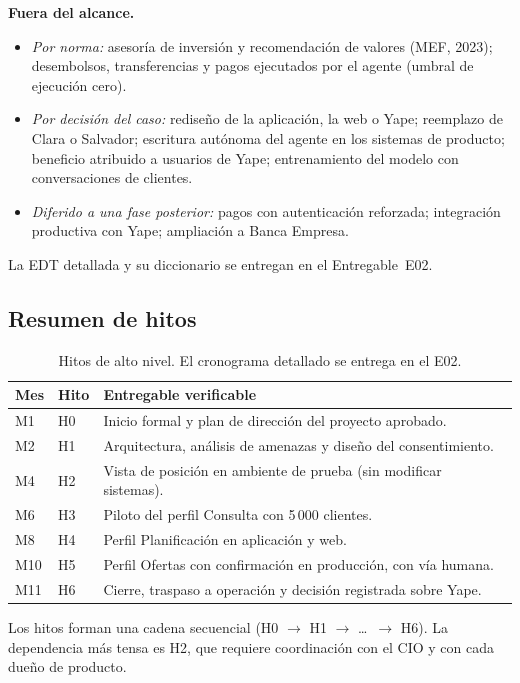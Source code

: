 \documentclass[11pt,a4paper]{article}
\begin{document}
\textbf{Fuera del alcance.}

\begin{itemize}
  \item \textit{Por norma:} asesoría de inversión y recomendación de valores (MEF, 2023); desembolsos, transferencias y pagos ejecutados por el agente (umbral de ejecución cero).
  \item \textit{Por decisión del caso:} rediseño de la aplicación, la web o Yape; reemplazo de Clara o Salvador; escritura autónoma del agente en los sistemas de producto; beneficio atribuido a usuarios de Yape; entrenamiento del modelo con conversaciones de clientes.
  \item \textit{Diferido a una fase posterior:} pagos con autenticación reforzada; integración productiva con Yape; ampliación a Banca Empresa.
\end{itemize}

La EDT detallada y su diccionario se entregan en el Entregable~E02.

\subsection{Resumen de hitos}

\begin{table}[H]
\centering
\caption{Hitos de alto nivel. El cronograma detallado se entrega en el E02.}
\small
\begin{tabularx}{\textwidth}{@{}l l X@{}}
\toprule
\textbf{Mes} & \textbf{Hito} & \textbf{Entregable verificable} \\
\midrule
M1  & H0 & Inicio formal y plan de dirección del proyecto aprobado. \\
M2  & H1 & Arquitectura, análisis de amenazas y diseño del consentimiento. \\
M4  & H2 & Vista de posición en ambiente de prueba (sin modificar sistemas). \\
M6  & H3 & Piloto del perfil Consulta con 5\,000 clientes. \\
M8  & H4 & Perfil Planificación en aplicación y web. \\
M10 & H5 & Perfil Ofertas con confirmación en producción, con vía humana. \\
M11 & H6 & Cierre, traspaso a operación y decisión registrada sobre Yape. \\
\bottomrule
\end{tabularx}
\end{table}

Los hitos forman una cadena secuencial (H0 $\to$ H1 $\to$ \dots\ $\to$ H6). La dependencia más tensa es H2, que requiere coordinación con el CIO y con cada dueño de producto.
\end{document}
